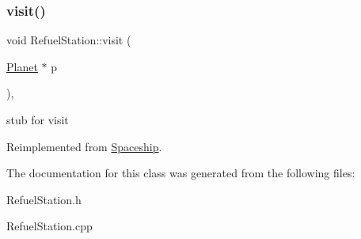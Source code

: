 \subsubsection{\texorpdfstring{visit()}{visit()}}
{\footnotesize\ttfamily void Refuel\+Station\+::visit (\begin{DoxyParamCaption}\item[{\hyperlink{classPlanet}{Planet} $\ast$}]{p }\end{DoxyParamCaption})\hspace{0.3cm}{\ttfamily [inline]}, {\ttfamily [virtual]}}

stub for visit 

Reimplemented from \hyperlink{classSpaceship}{Spaceship}.



The documentation for this class was generated from the following files\+:\begin{DoxyCompactItemize}
\item 
Refuel\+Station.\+h\item 
Refuel\+Station.\+cpp\end{DoxyCompactItemize}
